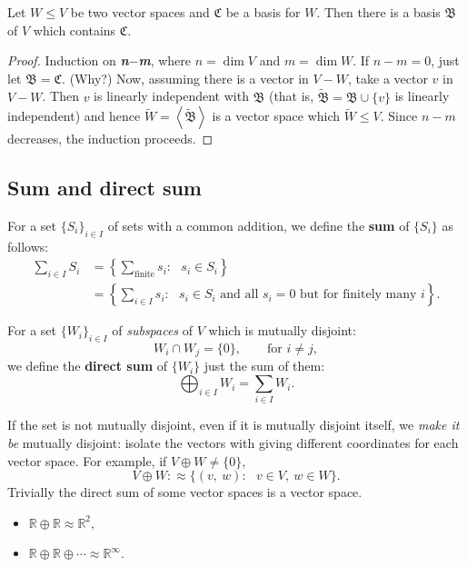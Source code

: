 \begin{theorem} Let $W\le V$ be two vector spaces and $\mathfrak C$ be a basis for $W$. Then there is a basis $\mathfrak B$ of $V$ which contains $\mathfrak C.$
\end{theorem}
\begin{proof}
Induction on \textbf{\textit{n$-$m}}, where $n=\operatorname{dim}V$ and $m=\operatorname{dim}W$. If $n-m=0$, just let $\mathfrak B = \mathfrak C.$ (Why?) Now, assuming there is a vector in $V - W$, take a vector $v$ in $V-W$. Then $v$ is linearly independent with $\mathfrak B$ (that is, $\tilde {\mathfrak B} = \mathfrak B \cup \{v\}$ is linearly independent) and hence $\tilde W = \left<\tilde {\mathfrak B }\right>$ is a vector space which $\tilde W \le V.$ Since $n-m$ decreases, the induction proceeds.
\end{proof}


\subsection{Sum and direct sum}
\begin{defn}
For a set $\{S_i\}_{i\in I}$ of sets with a common addition, we define the \textbf{sum} of $\{S_i\}$ as follows: \begin{align*}\sum_{i \in I}S_i &= \left\{ \sum_{\textrm{finite}} s_i:~~~ s_i \in S_i\right\} \\&= \left\{ \sum_{i \in I} s_i:~~~ s_i \in S_i\textrm{ and all }s_i = 0\textrm{ but for finitely many }i\right\}.\end{align*}
\end{defn}
\begin{defn}
For a set $\{W_i\}_{i\in I}$ of \textit{subspaces} of $V$ which is mutually disjoint: $$W_i \cap W_j = \{ 0 \},\qquad\textrm{for }i\ne j,$$ we define the \textbf{direct sum} of $\{W_i\}$ just the sum of them: $$\bigoplus_{i\in I}  W_i = \sum_{i \in I} W_i.$$

If the set is not mutually disjoint, even if it is mutually disjoint itself, we \textit{make it be} mutually disjoint: isolate the vectors with giving different coordinates for each vector space. For example, if $V\oplus W \ne \{0\}$, $$V\oplus W :\approx \{(v,~w):~~~v\in V,~ w\in W\}.$$
Trivially the direct sum of some vector spaces is a vector space.
\end{defn}

\begin{ex}
\leavevmode
\begin{itemize}
\item $\mathbb R \oplus \mathbb R \approx \mathbb R^2,$
\item $\mathbb R \oplus \mathbb R \oplus \cdots \approx \mathbb R^\infty.$
\end{itemize}
\end{ex}

